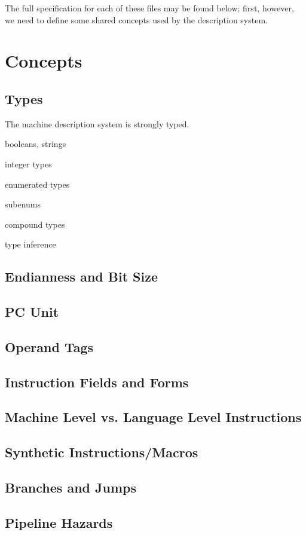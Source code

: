 The full specification for each of these files may be found below;
first, however, we need to define some shared concepts used by the
description system.

\section{Concepts}

\subsection{Types}

The {\bintools} machine description system is strongly typed.

booleans, strings

integer types

enumerated types

subenums

compound types

type inference

\subsection{Endianness and Bit Size}
\subsection{PC Unit}
\subsection{Operand Tags}
\subsection{Instruction Fields and Forms}
\subsection{Machine Level vs. Language Level Instructions}
\subsection{Synthetic Instructions/Macros}
\subsection{Branches and Jumps}
\subsection{Pipeline Hazards}
